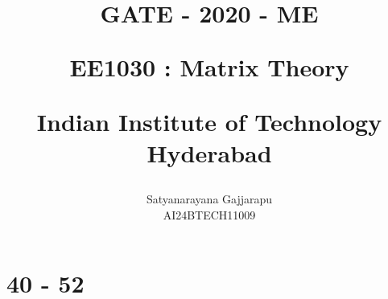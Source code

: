 \documentclass[journal]{IEEEtran}
\begin{document}

\vspace{3cm}




\title{
GATE - 2020 - ME

\large{EE1030 : Matrix Theory}

Indian Institute of Technology Hyderabad
}
\author{Satyanarayana Gajjarapu

AI24BTECH11009
}	





\maketitle




\bigskip

\renewcommand{\thefigure}{\theenumi}
\renewcommand{\thetable}{\theenumi}


\section{40 - 52}
\end{document}
